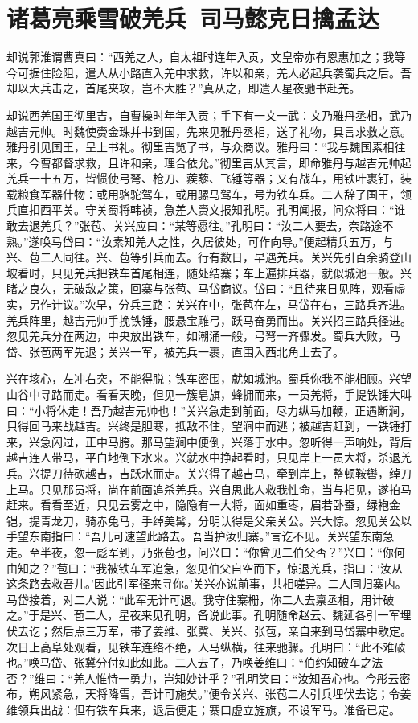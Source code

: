 \chapter{诸葛亮乘雪破羌兵~司马懿克日擒孟达}

却说郭淮谓曹真曰：“西羌之人，自太祖时连年入贡，文皇帝亦有恩惠加之；我等今可据住险阻，遣人从小路直入羌中求救，许以和亲，羌人必起兵袭蜀兵之后。吾却以大兵击之，首尾夹攻，岂不大胜？”真从之，即遣人星夜驰书赴羌。

却说西羌国王彻里吉，自曹操时年年入贡；手下有一文一武：文乃雅丹丞相，武乃越吉元帅。时魏使赍金珠并书到国，先来见雅丹丞相，送了礼物，具言求救之意。雅丹引见国王，呈上书礼。彻里吉览了书，与众商议。雅丹曰：“我与魏国素相往来，今曹都督求救，且许和亲，理合依允。”彻里吉从其言，即命雅丹与越吉元帅起羌兵一十五万，皆惯使弓弩、枪刀、蒺藜、飞锤等器；又有战车，用铁叶裹钉，装载粮食军器什物：或用骆驼驾车，或用骡马驾车，号为铁车兵。二人辞了国王，领兵直扣西平关。守关蜀将韩祯，急差人赍文报知孔明。孔明闻报，问众将曰：“谁敢去退羌兵？”张苞、关兴应曰：“某等愿往。”孔明曰：“汝二人要去，奈路途不熟。”遂唤马岱曰：“汝素知羌人之性，久居彼处，可作向导。”便起精兵五万，与兴、苞二人同往。兴、苞等引兵而去。行有数日，早遇羌兵。关兴先引百余骑登山坡看时，只见羌兵把铁车首尾相连，随处结寨；车上遍排兵器，就似城池一般。兴睹之良久，无破敌之策，回寨与张苞、马岱商议。岱曰：“且待来日见阵，观看虚实，另作计议。”次早，分兵三路：关兴在中，张苞在左，马岱在右，三路兵齐进。羌兵阵里，越吉元帅手挽铁锤，腰悬宝雕弓，跃马奋勇而出。关兴招三路兵径进。忽见羌兵分在两边，中央放出铁车，如潮涌一般，弓弩一齐骤发。蜀兵大败，马岱、张苞两军先退；关兴一军，被羌兵一裹，直围入西北角上去了。

兴在垓心，左冲右突，不能得脱；铁车密围，就如城池。蜀兵你我不能相顾。兴望山谷中寻路而走。看看天晚，但见一簇皂旗，蜂拥而来，一员羌将，手提铁锤大叫曰：“小将休走！吾乃越吉元帅也！”关兴急走到前面，尽力纵马加鞭，正遇断涧，只得回马来战越吉。兴终是胆寒，抵敌不住，望涧中而逃；被越吉赶到，一铁锤打来，兴急闪过，正中马胯。那马望涧中便倒，兴落于水中。忽听得一声响处，背后越吉连人带马，平白地倒下水来。兴就水中挣起看时，只见岸上一员大将，杀退羌兵。兴提刀待砍越吉，吉跃水而走。关兴得了越吉马，牵到岸上，整顿鞍辔，绰刀上马。只见那员将，尚在前面追杀羌兵。兴自思此人救我性命，当与相见，遂拍马赶来。看看至近，只见云雾之中，隐隐有一大将，面如重枣，眉若卧蚕，绿袍金铠，提青龙刀，骑赤兔马，手绰美髯，分明认得是父亲关公。兴大惊。忽见关公以手望东南指曰：“吾儿可速望此路去。吾当护汝归寨。”言讫不见。关兴望东南急走。至半夜，忽一彪军到，乃张苞也，问兴曰：“你曾见二伯父否？”兴曰：“你何由知之？”苞曰：“我被铁车军追急，忽见伯父自空而下，惊退羌兵，指曰：‘汝从这条路去救吾儿。’因此引军径来寻你。’关兴亦说前事，共相嗟异。二人同归寨内。马岱接着，对二人说：“此军无计可退。我守住寨栅，你二人去禀丞相，用计破之。”于是兴、苞二人，星夜来见孔明，备说此事。孔明随命赵云、魏延各引一军埋伏去讫；然后点三万军，带了姜维、张冀、关兴、张苞，亲自来到马岱寨中歇定。次日上高阜处观看，见铁车连络不绝，人马纵横，往来驰骤。孔明曰：“此不难破也。”唤马岱、张冀分付如此如此。二人去了，乃唤姜维曰：“伯约知破车之法否？”维曰：“羌人惟恃一勇力，岂知妙计乎？”孔明笑曰：“汝知吾心也。今彤云密布，朔风紧急，天将降雪，吾计可施矣。”便令关兴、张苞二人引兵埋伏去讫；令姜维领兵出战：但有铁车兵来，退后便走；寨口虚立旌旗，不设军马。准备已定。

